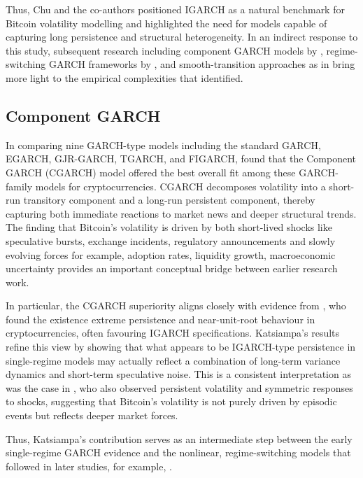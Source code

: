 \documentclass[12pt]{report}
\begin{document}
Thus, Chu and the co-authors positioned IGARCH as a natural benchmark for Bitcoin volatility modelling and highlighted the need for models capable of capturing long persistence and structural heterogeneity. In an indirect response to this study, subsequent research including component GARCH models 
by \cite{katsiampa2017volatility}, regime-switching GARCH frameworks by \cite{ardia2019regime}, and smooth-transition approaches as in \cite{bencheikh2020stgarch} bring more light to the empirical complexities that \cite{chu2017garchcrypto} identified.


\subsection{Component GARCH}

In comparing nine GARCH-type models including the standard GARCH, EGARCH, GJR-GARCH, TGARCH, and FIGARCH, \cite{katsiampa2017volatility} found that the Component GARCH (CGARCH) model offered the best overall fit among these GARCH-family models for cryptocurrencies. CGARCH decomposes volatility into a short-run transitory component and a long-run persistent component, thereby capturing both immediate reactions to market news and deeper structural trends. The finding that Bitcoin's volatility is driven by both short-lived shocks like speculative bursts, exchange incidents, regulatory announcements and slowly evolving forces for example, adoption rates, liquidity growth, macroeconomic uncertainty provides an important 
conceptual bridge between earlier research work.

In particular, the CGARCH superiority aligns closely with evidence from \cite{chu2017garchcrypto}, who found the existence extreme persistence and near-unit-root behaviour in cryptocurrencies, often favouring IGARCH specifications. Katsiampa's results refine this view by showing that what appears to be IGARCH-type persistence in single-regime models may actually 
reflect a combination of long-term variance dynamics and short-term speculative noise. This is a consistent interpretation as was the case in \cite{dyhrberg2016bitcoin}, who also observed persistent volatility and symmetric responses to shocks, suggesting that Bitcoin's volatility is not purely driven by episodic events but reflects deeper market forces.

Thus, Katsiampa's contribution serves as an intermediate step between the early single-regime GARCH evidence and the nonlinear, regime-switching models that followed in later studies, for example, \cite{ardia2019regime}. 
\end{document}
